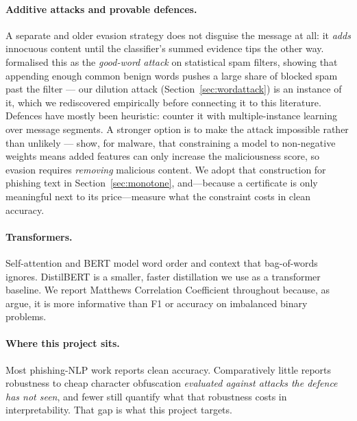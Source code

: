 \documentclass[11pt]{article}
\begin{document}
\paragraph{Additive attacks and provable defences.} A separate and older evasion strategy does not
disguise the message at all: it \emph{adds} innocuous content until the classifier's summed evidence
tips the other way. \citet{lowd2005good} formalised this as the \emph{good-word attack} on statistical
spam filters, showing that appending enough common benign words pushes a large share of blocked spam
past the filter --- our dilution attack (Section~\ref{sec:wordattack}) is an instance of it, which we
rediscovered empirically before connecting it to this literature. Defences have mostly been heuristic:
\citet{jorgensen2008multiple} counter it with multiple-instance learning over message segments.
A stronger option is to make the attack impossible rather than unlikely --- \citet{fleshman2018nonnegative}
show, for malware, that constraining a model to non-negative weights means added features can only
increase the maliciousness score, so evasion requires \emph{removing} malicious content. We adopt that
construction for phishing text in Section~\ref{sec:monotone}, and---because a certificate is only
meaningful next to its price---measure what the constraint costs in clean accuracy.

\paragraph{Transformers.} Self-attention \citep{vaswani2017attention} and BERT
\citep{devlin2019bert} model word order and context that bag-of-words ignores.
DistilBERT \citep{sanh2019distilbert} is a smaller, faster distillation we use as a
transformer baseline. We report Matthews Correlation Coefficient throughout because,
as \citet{chicco2020advantages} argue, it is more informative than F1 or accuracy on
imbalanced binary problems.

\paragraph{Where this project sits.} Most phishing-NLP work reports clean accuracy.
Comparatively little reports robustness to cheap character obfuscation
\emph{evaluated against attacks the defence has not seen}, and fewer still quantify
what that robustness costs in interpretability. That gap is what this project
targets.

\end{document}
